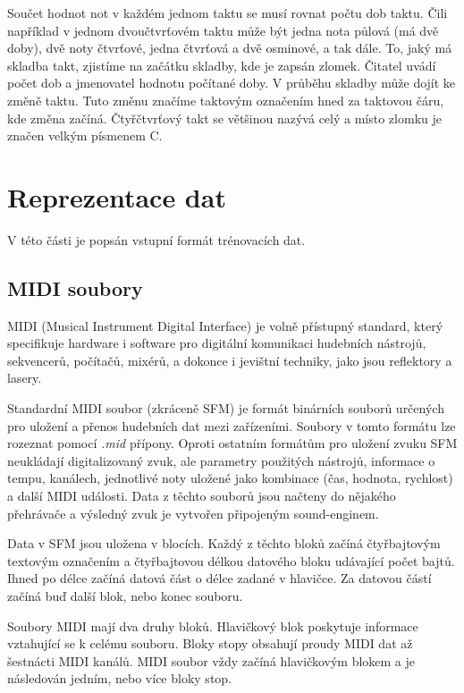Součet hodnot not v každém jednom taktu se musí rovnat počtu dob taktu.
Čili například v jednom  dvoučtvrťovém taktu 
může být jedna nota půlová (má dvě doby), 
dvě noty čtvrťové, jedna čtvrťová a dvě osminové, a tak dále.
To, jaký má skladba takt, zjistíme na začátku skladby, kde je zapsán zlomek.
Čitatel uvádí počet dob a jmenovatel hodnotu počítané doby.
V průběhu skladby může dojít ke změně taktu.
Tuto změnu značíme taktovým označením hned za taktovou čáru, 
kde změna začíná.
Čtyřčtvrťový takt se většinou nazývá celý 
a místo zlomku je značen velkým písmenem C.
\cite{cmiral,zenkl}

\chapter{Reprezentace dat}
V této části je popsán vstupní formát trénovacích dat.

\section{MIDI soubory}
MIDI (Musical Instrument Digital Interface) je volně přístupný standard,
který specifikuje hardware i software 
pro digitální komunikaci hudebních nástrojů,
sekvencerů, počítačů, mixérů, 
a dokonce i jevištní techniky, jako jsou reflektory a lasery.
\cite{MIDI_tutorials}
\par

Standardní MIDI soubor (zkráceně SFM) je formát binárních souborů 
určených pro uložení a přenos hudebních dat mezi zařízeními.
Soubory v tomto formátu lze rozeznat pomocí \emph{.mid} přípony.
Oproti ostatním formátům pro uložení zvuku 
SFM neukládají digitalizovaný zvuk,
ale parametry použitých nástrojů, informace o tempu, kanálech, 
jednotlivé noty uložené jako kombinace (čas, hodnota, rychlost) 
a další MIDI události.
Data z těchto souborů jsou načteny do nějakého přehrávače 
a výsledný zvuk je vytvořen připojeným sound-enginem.
\cite{MIDI_tutorials,Neznamy_aboutMIDIFiles}
\par

Data v SFM jsou uložena v blocích.
Každý z těchto bloků začíná čtyřbajtovým textovým označením 
a čtyřbajtovou délkou datového bloku udávající počet bajtů.
Ihned po délce začíná datová část o délce zadané v hlavičce.
Za datovou částí začíná buď další blok, nebo konec souboru.
\cite{MIDI_tutorials,Back_SMF_Specif}
\par

Soubory MIDI mají dva druhy bloků. 
Hlavičkový blok poskytuje informace vztahující se k celému souboru.
Bloky stopy obsahují proudy MIDI dat až šestnácti MIDI kanálů.
MIDI soubor vždy začíná hlavičkovým blokem 
a je následován jedním, nebo více bloky stop.\cite{Back_SMF_Specif}

